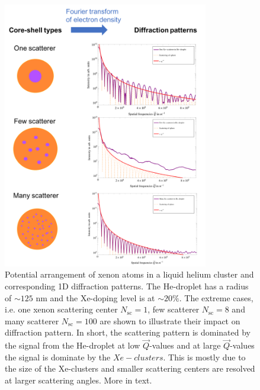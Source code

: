 \begin{figure}
 	\centering
 		\includegraphics[width=0.80\textwidth]{images/results/plum-pudding.png}
 	\caption{Potential arrangement of xenon atoms in a liquid helium cluster and corresponding 1D diffraction patterns. The He-droplet has a radius of $\sim 125$ nm and the Xe-doping level is at $\sim 20\%$. The extreme cases, i.e. one xenon scattering center $N_{\text{sc}}=1$, few scatterer $N_{\text{sc}}=8$ and many scatterer $N_{\text{sc}}=100$ are shown to illustrate their impact on diffraction pattern. In short, the scattering pattern is dominated by the signal from the He-droplet at low $\vec{Q}$-values and at large $\vec{Q}$-values the signal is dominate by the $Xe-clusters$. This is mostly due to the size of the Xe-clusters and smaller scattering centers are resolved at larger scattering angles. More in text.}
 	\label{fig:HeXe-plum-pudding}
\end{figure}
